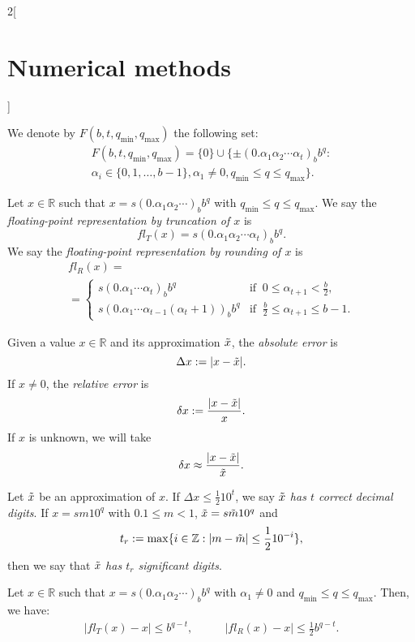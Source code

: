 \documentclass[class=article,10pt,crop=false]{standalone}
\begin{document}
\begin{multicols}{2}[\section{Numerical methods}]
\begin{table}[ht]
\end{table}
\begin{definition}
We denote by $F(b,t,q_\text{min},q_\text{max})$ the following set:
\begin{multline*}
    F(b,t,q_\text{min},q_\text{max})=\{0\}\cup\{\pm(0.\alpha_1\alpha_2\cdots\alpha_t)_bb^q:\\\alpha_i\in\{0,1,\ldots,b-1\},\alpha_1\ne0, q_\text{min}\leq q\leq q_\text{max}\}.
\end{multline*}
\end{definition}
\begin{definition}
Let $x\in\mathbb{R}$ such that $x=s(0.\alpha_1\alpha_2\cdots)_bb^q$ with $q_\text{min}\leq q\leq q_\text{max}$. We say the \textit{floating-point representation by truncation of $x$} is $$fl_T(x)=s(0.\alpha_1\alpha_2\cdots\alpha_t)_bb^q.$$ We say the \textit{floating-point representation by rounding of $x$} is
\begin{multline*}
fl_R(x)=\\=\left\{\begin{array}{ll}
        s(0.\alpha_1\cdots\alpha_t)_bb^q & \text{if}\;\; 0\leq\alpha_{t+1}<\frac{b}{2},\\
        s(0.\alpha_1\cdots\alpha_{t-1}(\alpha_t+1))_bb^q & \text{if}\;\; \frac{b}{2}\leq\alpha_{t+1}\leq b-1.
    \end{array}\right.
\end{multline*}
\end{definition}
\begin{definition}
Given a value $x\in\mathbb{R}$ and its approximation $\Tilde{x}$, the \textit{absolute error} is $$\Delta x:=|x-\Tilde{x}|.$$ If $x\ne 0$, the \textit{relative error} is $$\delta x:=\frac{|x-\Tilde{x}|}{x}.$$ If $x$ is unknown, we will take $$\delta x\approx\frac{|x-\Tilde{x}|}{\Tilde{x}}.$$
\end{definition}
\begin{definition}
Let $\Tilde{x}$ be an approximation of $x$. If $\Delta x\leq\frac{1}{2}10^t$, we say \textit{$\Tilde{x}$ has $t$ correct decimal digits}. If $x=sm10^q$ with $0.1\leq m<1$, $\Tilde{x}=s\Tilde{m}10^q$ and $$t_r:=\max\{i\in\mathbb{Z}:|m-\Tilde{m}|\leq\frac{1}{2}10^{-i}\},$$ then we say that $\Tilde{x}$ \textit{has $t_r$ significant digits}.
\end{definition}
Let $x\in\mathbb{R}$ such that $x=s(0.\alpha_1\alpha_2\cdots)_bb^q$ with $\alpha_1\ne0$ and $q_\text{min}\leq q\leq q_\text{max}$. Then, we have:
\begin{align*}
    \left|fl_T(x)-x\right|\leq b^{q-t},\quad&\quad \left|fl_R(x)-x\right|\leq\frac{1}{2}b^{q-t}.\\

\end{align*}
\end{multicols}
\end{document}
